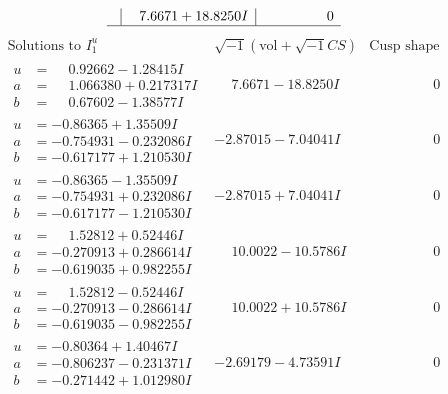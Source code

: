 \documentclass[1p]{elsarticle_modified}
\theoremstyle{definition}
\newcommand{\I}{\sqrt{-1}}
\begin{document}
$$\begin{array}{c|c|c}
 & \phantom{-}7.6671 + 18.8250 I & \phantom{-0.000000 } 0\\
 \hline 
 \end{array}$$\newpage$$\begin{array}{c|c|c}  
\text{Solutions to }I^u_{1}& \I (\text{vol} + \sqrt{-1}CS) & \text{Cusp shape}\\
 \hline 
\begin{aligned}
u &= \phantom{-}0.92662 - 1.28415 I \\
a &= \phantom{-}1.066380 + 0.217317 I \\
b &= \phantom{-}0.67602 - 1.38577 I\end{aligned}
 & \phantom{-}7.6671 - 18.8250 I & \phantom{-0.000000 } 0 \\ \hline\begin{aligned}
u &= -0.86365 + 1.35509 I \\
a &= -0.754931 - 0.232086 I \\
b &= -0.617177 + 1.210530 I\end{aligned}
 & -2.87015 - 7.04041 I & \phantom{-0.000000 } 0 \\ \hline\begin{aligned}
u &= -0.86365 - 1.35509 I \\
a &= -0.754931 + 0.232086 I \\
b &= -0.617177 - 1.210530 I\end{aligned}
 & -2.87015 + 7.04041 I & \phantom{-0.000000 } 0 \\ \hline\begin{aligned}
u &= \phantom{-}1.52812 + 0.52446 I \\
a &= -0.270913 + 0.286614 I \\
b &= -0.619035 + 0.982255 I\end{aligned}
 & \phantom{-}10.0022 - 10.5786 I & \phantom{-0.000000 } 0 \\ \hline\begin{aligned}
u &= \phantom{-}1.52812 - 0.52446 I \\
a &= -0.270913 - 0.286614 I \\
b &= -0.619035 - 0.982255 I\end{aligned}
 & \phantom{-}10.0022 + 10.5786 I & \phantom{-0.000000 } 0 \\ \hline\begin{aligned}
u &= -0.80364 + 1.40467 I \\
a &= -0.806237 - 0.231371 I \\
b &= -0.271442 + 1.012980 I\end{aligned}
 & -2.69179 - 4.73591 I & \phantom{-0.000000 } 0 \\ \hline\begin{aligned}

\end{aligned}
\end{array}$$
\end{document}
